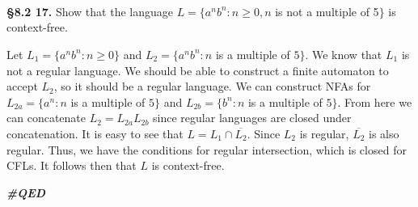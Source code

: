 \documentclass[12pt,letter]{article}
\newcommand{\QED}{
	\begin{flushright}
		\textit{\textbf{\#QED}}
	\end{flushright}
}
\begin{document}
\ \\
\ \\
\ \\

\textbf{\S 8.2 17.} Show that the language $L = \{a^n b^n : n \geq 0, n$ is not a multiple of 5$\}$ is context-free.

Let $L_1 = \{a^n b^n : n \geq 0\}$ and $L_2 = \{ a^n b^n : n$ is a multiple of $5\}$. We know that $L_1$ is not a regular language. We should be able to construct a finite automaton to accept $L_2$, so it should be a regular language. We can construct NFAs for $L_{2a} = \{a^n : n$ is a multiple of $5\}$ and $L_{2b} = \{b^n : n$ is a multiple of $5\}$. From here we can concatenate $L_2 = L_{2a}L_{2b}$ since regular languages are closed under concatenation. It is easy to see that $L = L_1 \cap \overline{L_2}$. Since $L_2$ is regular, $\overline{L_2}$ is also regular. Thus, we have the conditions for regular intersection, which is closed for CFLs. It follows then that $L$ is context-free. \QED 
\end{document}
